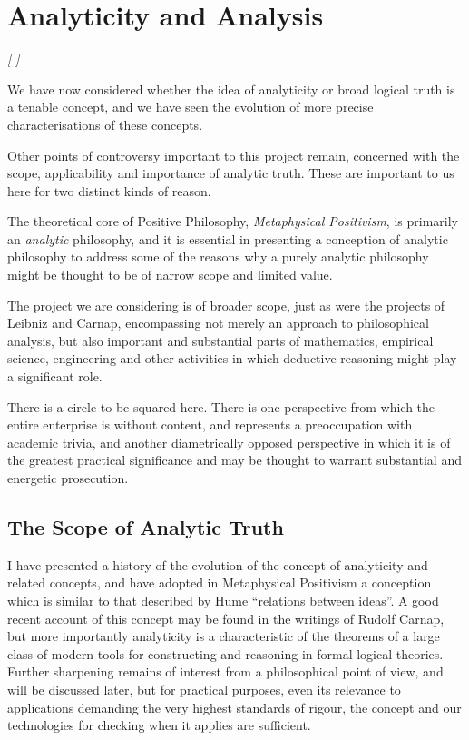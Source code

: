 
\chapter{Analyticity and Analysis}\label{AnalyticityAnalysis}

\emph{[
]}

We have now considered whether the idea of analyticity or broad
logical truth is a tenable concept, and we have seen the evolution of
more precise characterisations of these concepts.

Other points of controversy important to this project remain,
concerned with the scope, applicability and importance of analytic
truth.
These are important to us here for two distinct kinds of reason.

The theoretical core of Positive Philosophy, \emph{Metaphysical
  Positivism}, is primarily an \emph{analytic} philosophy, and it is
essential in presenting a conception of analytic philosophy to address
some of the reasons why a purely analytic philosophy might be thought
to be of narrow scope and limited value.

The project we are considering is of broader scope, just as were the
projects of Leibniz and Carnap, encompassing not merely an approach to
philosophical analysis, but also important and substantial parts of
mathematics, empirical science, engineering and other activities in
which deductive reasoning might play a significant role.

There is a circle to be squared here.
There is one perspective from which the entire enterprise is without
content, and represents a preoccupation with academic trivia, and
another diametrically opposed perspective in which it is of the
greatest practical significance and may be thought to warrant
substantial and energetic prosecution.

\section{The Scope of Analytic Truth}

I have presented a history of the evolution of the concept of
analyticity and related concepts, and have adopted in Metaphysical
Positivism a conception which is similar to that described by Hume
``relations between ideas''.
A good recent account of this concept may be found in the writings of
Rudolf Carnap, but more importantly analyticity is a characteristic of
the theorems of a large class of modern tools for constructing and
reasoning in formal logical theories.
Further sharpening remains of interest from a philosophical point of
view, and will be discussed later, but for practical purposes, even
its relevance to applications demanding the very highest standards of
rigour, the concept and our technologies for checking when it applies
are sufficient.

